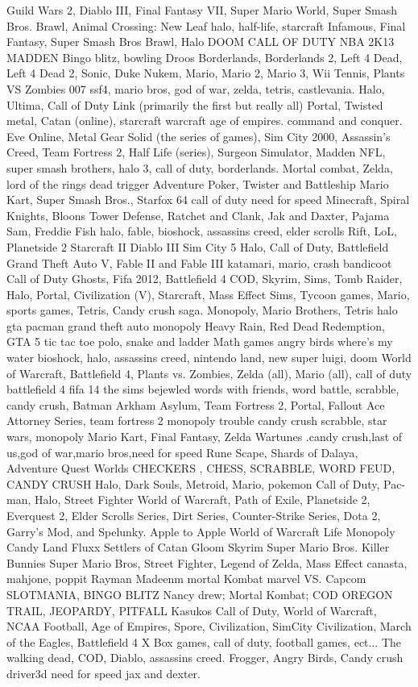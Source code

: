 Guild Wars 2, Diablo III, Final Fantasy VII, Super Mario World, Super Smash Bros. Brawl, Animal Crossing: New Leaf
halo, half-life, starcraft
Infamous, Final Fantasy, Super Smash Bros Brawl, Halo
DOOM  CALL OF DUTY  NBA 2K13  MADDEN 
Bingo blitz, bowling
Droos
Borderlands, Borderlands 2, Left 4 Dead, Left 4 Dead 2, Sonic, Duke Nukem, Mario, Mario 2, Mario 3, Wii Tennis, Plants VS Zombies
007
ssf4, mario bros, god of war, zelda, tetris, castlevania.
Halo, Ultima, Call of Duty
Link (primarily the first but really all) Portal, Twisted metal, Catan (online), 
starcraft warcraft age of empires. command and conquer.
Eve Online, Metal Gear Solid (the series of games), Sim City 2000, Assassin's Creed, Team Fortress 2, Half Life (series), Surgeon Simulator, Madden NFL, 
super smash brothers, halo 3, call of duty, borderlands.
Mortal combat, Zelda, lord of the rings
dead trigger
Adventure
Poker, Twister and Battleship
Mario Kart, Super Smash Bros., Starfox 64
call of duty need for speed
Minecraft, Spiral Knights, Bloons Tower Defense, Ratchet and Clank, Jak and Daxter, Pajama Sam, Freddie Fish
halo, fable, bioshock, assassins creed, elder scrolls
Rift, LoL, Planetside 2
Starcraft II  Diablo III  Sim City 5
Halo, Call of Duty, Battlefield
Grand Theft Auto V, Fable II and Fable III
katamari, mario, crash bandicoot
Call of Duty Ghosts, Fifa 2012, Battlefield 4
COD, Skyrim, Sims, Tomb Raider, Halo, Portal, Civilization (V), Starcraft, Mass Effect
Sims, Tycoon games, Mario, sports games, Tetris, Candy crush saga.
Monopoly, Mario Brothers, Tetris
halo gta
pacman grand theft auto monopoly
Heavy Rain, Red Dead Redemption, GTA 5
tic tac toe
polo, snake and ladder
Math games
angry birds  where's my water
bioshock, halo, assassins creed, nintendo land, new super luigi, doom
World of Warcraft, Battlefield 4, Plants vs. Zombies, Zelda (all), Mario (all), 
call of duty  battlefield 4  fifa 14  the sims  
bejewled
words with friends, word battle, scrabble, candy crush, 
Batman Arkham Asylum, Team Fortress 2, Portal, Fallout
Ace Attorney Series, team fortress 2
monopoly  trouble  candy crush
scrabble, star wars, monopoly
Mario Kart, Final Fantasy, Zelda
Wartunes .candy crush,last of us,god of war,mario bros,need for speed
Rune Scape, Shards of Dalaya, Adventure Quest Worlds
CHECKERS , CHESS, SCRABBLE, WORD FEUD, CANDY CRUSH
Halo, Dark Souls, Metroid, Mario, pokemon
Call of Duty, Pac-man, Halo, Street Fighter
World of Warcraft, Path of Exile, Planetside 2, Everquest 2, Elder Scrolls Series, Dirt Series, Counter-Strike Series, Dota 2, Garry's Mod, and Spelunky.
Apple to Apple  World of Warcraft  Life  Monopoly  Candy Land  Fluxx  Settlers of Catan  Gloom  Skyrim  Super Mario Bros.  Killer Bunnies
Super Mario Bros, Street Fighter, Legend of Zelda, Mass Effect
canasta, mahjone, poppit
Rayman  Madeenm  mortal Kombat  marvel VS. Capcom
SLOTMANIA, BINGO BLITZ
Nancy drew; Mortal Kombat; COD
OREGON TRAIL, JEOPARDY, PITFALL
Kasukos
Call of Duty, World of Warcraft, NCAA Football, Age of Empires, Spore, Civilization, SimCity
Civilization, March of the Eagles, Battlefield 4
X Box games, call of duty, football games, ect...
The walking dead, COD, Diablo, assassins creed.
Frogger, Angry Birds, Candy crush
driver3d need for speed jax and dexter.

